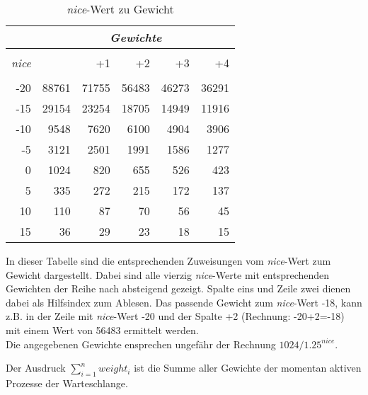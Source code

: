 \begin {table}[h]
\begin{center}
\begin{tabular}{r|rrrrr}
 &	\multicolumn{5}{c}{\textit{Gewichte}} \\
	\hline\hline
	\\[\dimexpr-\normalbaselineskip+2pt]
	\textit{nice} & &+1	&	+2	& +3	& +4	\\
	\hline
    \\[\dimexpr-\normalbaselineskip+2pt]
	-20	&	88761	&	71755	&	56483	&	46273	&	36291	\\
	-15	&	29154 	&	23254 	&	18705 	&	14949 	&	11916	\\
	-10	&	9548	&	7620	&	6100	&	4904	&	3906	\\
	-5 	&	3121 	&	2501 	&	1991 	&	1586 	&	1277	\\
	0	&	1024 	&	820		&	655		&	526		&	423		\\
	5 	&	335 	&	272		& 	215		&	172		&	137		\\
	10	&	110		&	87 		&	70 		&	56 		&	45		\\
	15 	&	36 		&	29 		&	23 		&	18 		&	15	 	\\		
\end{tabular}
\caption {\textit{nice}-Wert zu Gewicht} \label{tab:nice2weight} 
\end{center}
\end{table}


In dieser Tabelle sind die entsprechenden Zuweisungen vom \textit{nice}-Wert zum Gewicht dargestellt. 
Dabei sind alle vierzig \textit{nice}-Werte mit entsprechenden Gewichten der Reihe nach absteigend gezeigt.
Spalte eins und Zeile zwei dienen dabei als Hilfsindex zum Ablesen. Das passende Gewicht zum \textit{nice}-Wert -18, kann z.B. in der Zeile mit \textit{nice}-Wert -20 und der Spalte +2 (Rechnung: -20+2=-18) mit einem Wert von 56483 ermittelt werden.\\
Die angegebenen Gewichte ensprechen ungefähr der Rechnung $1024/1.25^{nice}$.

Der Ausdruck \textit{$\sum_{i=1}^{n} weight_{i}$} ist die Summe aller Gewichte der momentan aktiven Prozesse der Warte\-schlan\-ge.

